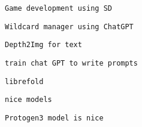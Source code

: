              
             
              \protect\hypertarget{ID_303265271}{}{}

\begin{verbatim}
Game development using SD
\end{verbatim}
             

             
             
              \protect\hypertarget{ID_1491345202}{}{}

\begin{verbatim}
Wildcard manager using ChatGPT
\end{verbatim}
             

             
             
              \protect\hypertarget{ID_1533775419}{}{}

\begin{verbatim}
Depth2Img for text
\end{verbatim}
             

             
             
              \protect\hypertarget{ID_1348922781}{}{}

\begin{verbatim}
train chat GPT to write prompts
\end{verbatim}
             
           

           
           
            \protect\hypertarget{ID_133890195}{}{}

\begin{verbatim}
librefold
\end{verbatim}
           

           
           
            \protect\hypertarget{ID_1325098056}{}{}

\begin{verbatim}
nice models
\end{verbatim}

             
             
              \protect\hypertarget{ID_274955700}{}{}

\begin{verbatim}
Protogen3 model is nice
\end{verbatim}
             

             
             
              \protect\hypertarget{ID_925522857}{}{}

